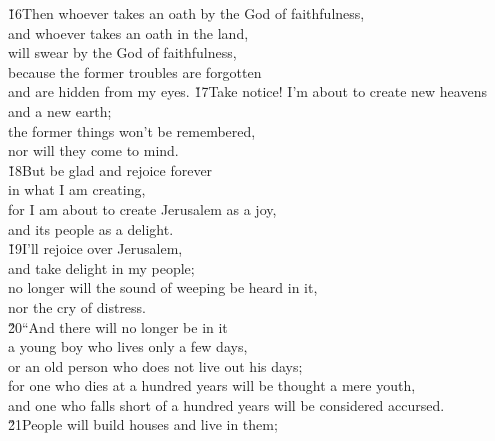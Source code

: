 \begin{poetry}
\poeml \v{16}Then whoever takes an oath by the God of faithfulness, \\
\poemll    and whoever takes an oath in the land, \\
\poemlll       will swear by the God of faithfulness, \\
\poeml because the former troubles are forgotten \\
\poemll    and are hidden from my eyes.
\poeml \v{17}Take notice! I'm about to create new heavens \\
\poemll    and a new earth; \\
\poeml the former things won't be remembered, \\
\poemll    nor will they come to mind. \\
\poeml \v{18}But be glad and rejoice forever \\
\poemll    in what I am creating, \\
\poeml for I am about to create Jerusalem as a joy, \\
\poemll    and its people as a delight. \\
\poeml \v{19}I'll rejoice over Jerusalem, \\
\poemll    and take delight in my people; \\
\poeml no longer will the sound of weeping be heard in it, \\
\poemll    nor the cry of distress. \\
\poeml \v{20}``And there will no longer be in it \\
\poemll    a young boy who lives only a few days, \\
\poemlll       or an old person who does not live out his days; \\
\poeml for one who dies at a hundred years will be thought a mere youth, \\
\poemll    and one who falls short of a hundred years will be considered accursed. \\
\poeml \v{21}People will build houses and live in them; \\

\end{poetry}
